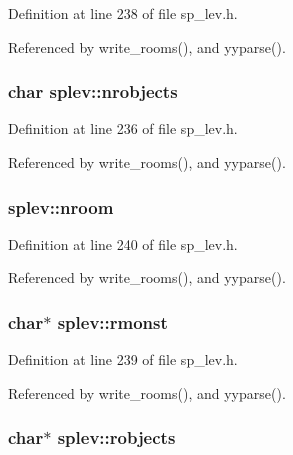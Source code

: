 Definition at line 238 of file sp\+\_\+lev.\+h.



Referenced by write\+\_\+rooms(), and yyparse().

\hypertarget{structsplev_afc4267345f75bcea5f35eae876918c52}{
\subsubsection[{nrobjects}]{\setlength{\rightskip}{0pt plus 5cm}char splev\+::nrobjects}}\label{structsplev_afc4267345f75bcea5f35eae876918c52}


Definition at line 236 of file sp\+\_\+lev.\+h.



Referenced by write\+\_\+rooms(), and yyparse().

\hypertarget{structsplev_a936751db31b42a6a4222b781c61e309c}{
\subsubsection[{nroom}]{ splev\+::nroom}}\label{structsplev_a936751db31b42a6a4222b781c61e309c}


Definition at line 240 of file sp\+\_\+lev.\+h.



Referenced by write\+\_\+rooms(), and yyparse().

\hypertarget{structsplev_a42df052ed782bc58321bdead20ede49c}{
\subsubsection[{rmonst}]{\setlength{\rightskip}{0pt plus 5cm}char$\ast$ splev\+::rmonst}}\label{structsplev_a42df052ed782bc58321bdead20ede49c}


Definition at line 239 of file sp\+\_\+lev.\+h.



Referenced by write\+\_\+rooms(), and yyparse().

\hypertarget{structsplev_a86a82c3d213c379a586bce1452744069}{
\subsubsection[{robjects}]{\setlength{\rightskip}{0pt plus 5cm}char$\ast$ splev\+::robjects}}\label{structsplev_a86a82c3d213c379a586bce1452744069}



